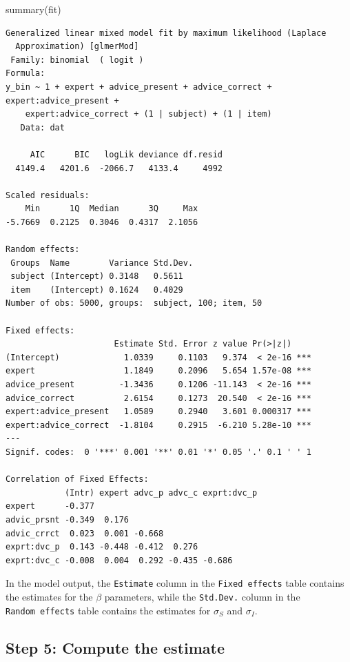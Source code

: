 \documentclass[
  man,
  floatsintext,
  longtable,
  a4paper,
  nolmodern,
  notxfonts,
  notimes,
  colorlinks=true,linkcolor=blue,citecolor=blue,urlcolor=blue]{apa7}
\newenvironment{Shaded}{\begin{snugshade}}{\end{snugshade}}
\newcommand{\FunctionTok}[1]{\textcolor[rgb]{0.28,0.35,0.67}{#1}}
\newcommand{\NormalTok}[1]{\textcolor[rgb]{0.00,0.23,0.31}{#1}}
\begin{document}
\begin{Shaded}
\begin{Highlighting}[]
\FunctionTok{summary}\NormalTok{(fit)}
\end{Highlighting}
\end{Shaded}

\begin{verbatim}
Generalized linear mixed model fit by maximum likelihood (Laplace
  Approximation) [glmerMod]
 Family: binomial  ( logit )
Formula: 
y_bin ~ 1 + expert + advice_present + advice_correct + expert:advice_present +  
    expert:advice_correct + (1 | subject) + (1 | item)
   Data: dat

     AIC      BIC   logLik deviance df.resid 
  4149.4   4201.6  -2066.7   4133.4     4992 

Scaled residuals: 
    Min      1Q  Median      3Q     Max 
-5.7669  0.2125  0.3046  0.4317  2.1056 

Random effects:
 Groups  Name        Variance Std.Dev.
 subject (Intercept) 0.3148   0.5611  
 item    (Intercept) 0.1624   0.4029  
Number of obs: 5000, groups:  subject, 100; item, 50

Fixed effects:
                      Estimate Std. Error z value Pr(>|z|)    
(Intercept)             1.0339     0.1103   9.374  < 2e-16 ***
expert                  1.1849     0.2096   5.654 1.57e-08 ***
advice_present         -1.3436     0.1206 -11.143  < 2e-16 ***
advice_correct          2.6154     0.1273  20.540  < 2e-16 ***
expert:advice_present   1.0589     0.2940   3.601 0.000317 ***
expert:advice_correct  -1.8104     0.2915  -6.210 5.28e-10 ***
---
Signif. codes:  0 '***' 0.001 '**' 0.01 '*' 0.05 '.' 0.1 ' ' 1

Correlation of Fixed Effects:
            (Intr) expert advc_p advc_c exprt:dvc_p
expert      -0.377                                 
advic_prsnt -0.349  0.176                          
advic_crrct  0.023  0.001 -0.668                   
exprt:dvc_p  0.143 -0.448 -0.412  0.276            
exprt:dvc_c -0.008  0.004  0.292 -0.435 -0.686     
\end{verbatim}

In the model output, the \texttt{Estimate} column in the
\texttt{Fixed\ effects} table contains the estimates for the \(\beta\)
parameters, while the \texttt{Std.Dev.} column in the
\texttt{Random\ effects} table contains the estimates for \(\sigma_S\)
and \(\sigma_I\).

\subsection{Step 5: Compute the
estimate}\label{step-5-compute-the-estimate}
\end{document}
